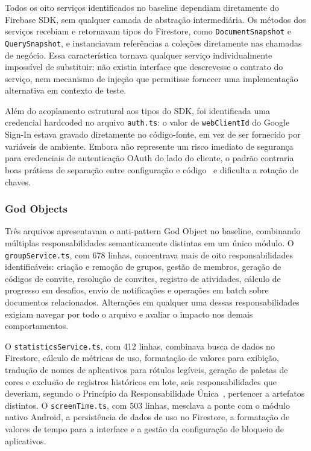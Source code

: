 \documentclass[sigconf,anonymous]{acmart}
\begin{document}
Todos os oito serviços identificados no baseline dependiam diretamente do Firebase SDK, sem qualquer camada de abstração intermediária. Os métodos dos serviços recebiam e retornavam tipos do Firestore, como \texttt{DocumentSnapshot} e \texttt{QuerySnapshot}, e instanciavam referências a coleções diretamente nas chamadas de negócio. Essa característica tornava qualquer serviço individualmente impossível de substituir: não existia interface que descrevesse o contrato do serviço, nem mecanismo de injeção que permitisse fornecer uma implementação alternativa em contexto de teste.

Além do acoplamento estrutural aos tipos do SDK, foi identificada uma credencial hardcoded no arquivo \texttt{auth.ts}: o valor de \texttt{webClientId} do Google Sign-In estava gravado diretamente no código-fonte, em vez de ser fornecido por variáveis de ambiente. Embora não represente um risco imediato de segurança para credenciais de autenticação OAuth do lado do cliente, o padrão contraria boas práticas de separação entre configuração e código~\cite{Feathers2004} e dificulta a rotação de chaves.

\subsubsection{God Objects}

Três arquivos apresentavam o anti-pattern God Object no baseline, combinando múltiplas responsabilidades semanticamente distintas em um único módulo. O \texttt{groupService.ts}, com 678 linhas, concentrava mais de oito responsabilidades identificáveis: criação e remoção de grupos, gestão de membros, geração de códigos de convite, resolução de convites, registro de atividades, cálculo de progresso em desafios, envio de notificações e operações em batch sobre documentos relacionados. Alterações em qualquer uma dessas responsabilidades exigiam navegar por todo o arquivo e avaliar o impacto nos demais comportamentos.

O \texttt{statisticsService.ts}, com 412 linhas, combinava busca de dados no Firestore, cálculo de métricas de uso, formatação de valores para exibição, tradução de nomes de aplicativos para rótulos legíveis, geração de paletas de cores e exclusão de registros históricos em lote, seis responsabilidades que deveriam, segundo o Princípio da Responsabilidade Única~\cite{Martin2017}, pertencer a artefatos distintos. O \texttt{screenTime.ts}, com 503 linhas, mesclava a ponte com o módulo nativo Android, a persistência de dados de uso no Firestore, a formatação de valores de tempo para a interface e a gestão da configuração de bloqueio de aplicativos.
\end{document}
